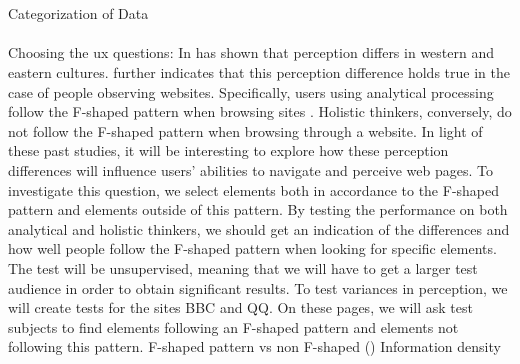   \\\\
  Categorization of Data
  \\\\
  Choosing the ux questions:
  In \cite{Holistic_vs_Analytic} has shown that perception differs in western and eastern cultures. \cite{cross_web} further indicates that this perception difference holds true in the case of people observing websites. Specifically, users using analytical processing follow the F-shaped pattern when browsing sites \cite{pernice2014people}. Holistic thinkers, conversely, do not follow the F-shaped pattern when browsing through a website. \cite{cross_web} In light of these past studies, it will be interesting to explore how these perception differences will influence users' abilities to navigate and perceive web pages. To investigate this question, we select elements both in accordance to the F-shaped pattern and elements outside of this pattern. By testing the performance on both analytical and holistic thinkers, we should get an indication of the differences and  how well people follow the F-shaped pattern when looking for specific elements. The test will be unsupervised, meaning that we will have to get a larger test audience in order to obtain significant results. To test variances in perception, we will create tests for the sites BBC and QQ. On these pages, we will ask test subjects to find elements following an F-shaped pattern and elements not following this pattern.
  F-shaped pattern vs non F-shaped (\cite{cross_web})
  Information density
   
 